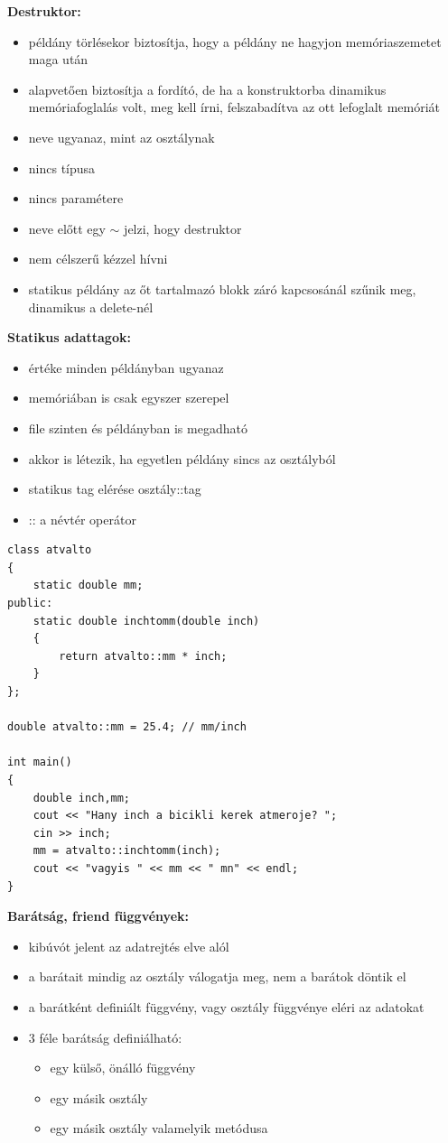 \noindent \textbf{Destruktor:}
\begin{itemize}
    \item példány törlésekor biztosítja, hogy a példány ne hagyjon memóriaszemetet maga után
    \item alapvetően biztosítja a fordító, de ha a konstruktorba dinamikus memóriafoglalás volt, meg kell írni, felszabadítva az ott lefoglalt memóriát
    \item neve ugyanaz, mint az osztálynak
    \item nincs típusa
    \item nincs paramétere
    \item neve előtt egy $\sim$ jelzi, hogy destruktor
    \item nem célszerű kézzel hívni
    \item statikus példány az őt tartalmazó blokk záró kapcsosánál szűnik meg, dinamikus a delete-nél
\end{itemize}

\noindent \textbf{Statikus adattagok:}
\begin{itemize}
    \item értéke minden példányban ugyanaz
    \item memóriában is csak egyszer szerepel
    \item file szinten és példányban is megadható
    \item akkor is létezik, ha egyetlen példány sincs az osztályból
    \item statikus tag elérése osztály::tag
    \item :: a névtér operátor
\end{itemize}

\begin{verbatim}
class atvalto
{
    static double mm;
public:
    static double inchtomm(double inch)
    {
        return atvalto::mm * inch;
    }
};

double atvalto::mm = 25.4; // mm/inch

int main()
{
    double inch,mm;
    cout << "Hany inch a bicikli kerek atmeroje? ";
    cin >> inch;
    mm = atvalto::inchtomm(inch);
    cout << "vagyis " << mm << " mn" << endl;
}
\end{verbatim}

\noindent \textbf{Barátság, friend függvények:}
\begin{itemize}
    \item kibúvót jelent az adatrejtés elve alól
    \item a barátait mindig az osztály válogatja meg, nem a barátok döntik el
    \item a barátként definiált függvény, vagy osztály függvénye eléri az adatokat
    \item 3 féle barátság definiálható:
    \begin{itemize}
        \item egy külső, önálló függvény
        \item egy másik osztály
        \item egy másik osztály valamelyik metódusa
    \end{itemize}
\end{itemize}